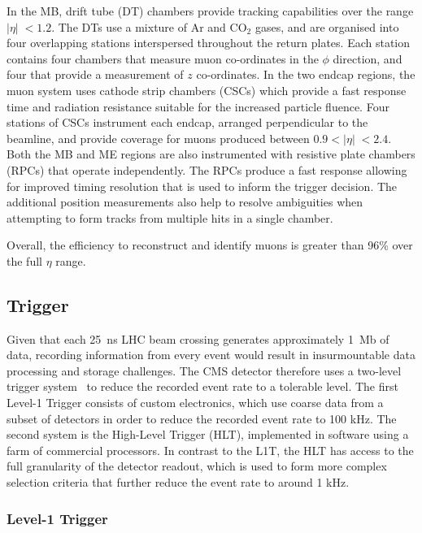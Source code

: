 In the MB, drift tube (DT) chambers provide tracking capabilities over the range $|\eta|\;<1.2$. The DTs use a mixture of Ar and CO$_{2}$ gases, and are organised into four overlapping stations interspersed throughout the return plates. Each station contains four chambers that measure muon co-ordinates in the $\phi$ direction, and four that provide a measurement of $z$ co-ordinates. In the two endcap regions, the muon system uses cathode strip chambers (CSCs) which provide a fast response time and radiation resistance suitable for the increased particle fluence. Four stations of CSCs instrument each endcap, arranged perpendicular to the beamline, and provide coverage for muons produced between $0.9<|\eta|\;<2.4$. Both the MB and ME regions are also instrumented with resistive plate chambers (RPCs) that operate independently. The RPCs produce a fast response allowing for improved timing resolution that is used to inform the trigger decision. The additional position measurements also help to resolve ambiguities when attempting to form tracks from multiple hits in a single chamber. %

Overall, the efficiency to reconstruct and identify muons is greater than 96\%  over the full $\eta$ range. 




\subsection{Trigger}

Given that each 25~ns LHC beam crossing generates approximately 1~Mb of data, recording information from every event would result in insurmountable data processing and storage challenges. The CMS detector therefore uses a two-level trigger system~\cite{CMS_L1T,HLT} to reduce the recorded event rate to a tolerable level. The first Level-1 Trigger consists of custom electronics, which use coarse data from a subset of detectors in order to reduce the recorded event rate to 100 kHz. The second system is the High-Level Trigger (HLT), implemented in software using a farm of commercial processors. In contrast to the L1T, the HLT has access to the full granularity of the detector readout, which is used to form more complex selection criteria that further reduce the event rate to around 1 kHz.

\subsubsection{Level-1 Trigger}

